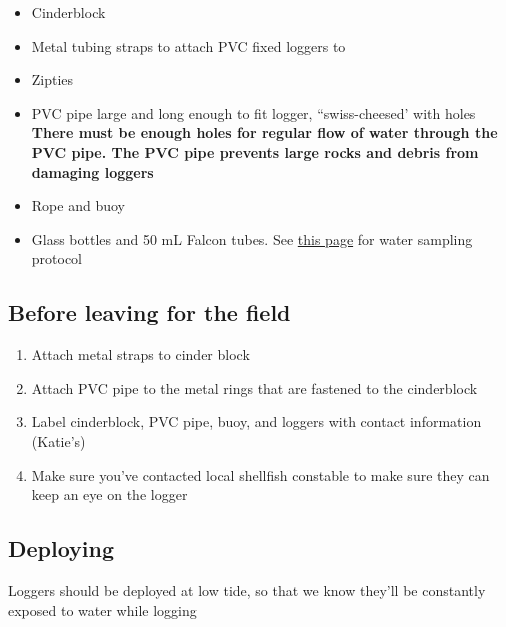 \documentclass[
  letterpaper,
  DIV=11,
  numbers=noendperiod]{scrreprt}
\begin{document}
\begin{itemize}
\item
  Cinderblock
\item
  Metal tubing straps to attach PVC fixed loggers to
\item
  Zipties
\item
  PVC pipe large and long enough to fit logger, ``swiss-cheesed' with
  holes \textbf{There must be enough holes for regular flow of water
  through the PVC pipe. The PVC pipe prevents large rocks and debris
  from damaging loggers}
\item
  Rope and buoy
\item
  Glass bottles and 50 mL Falcon tubes. See
  \href{https://bmford11.github.io/lotterhoslabprotocols/watersampling/}{this
  page} for water sampling protocol
\end{itemize}

\hypertarget{before-leaving-for-the-field-1}{%
\subsection*{\texorpdfstring{\textbf{Before leaving for the
field}}{Before leaving for the field}}\label{before-leaving-for-the-field-1}}

\begin{enumerate}
\def\labelenumi{\arabic{enumi}.}
\item
  Attach metal straps to cinder block
\item
  Attach PVC pipe to the metal rings that are fastened to the
  cinderblock
\item
  Label cinderblock, PVC pipe, buoy, and loggers with contact
  information (Katie's)
\item
  Make sure you've contacted local shellfish constable to make sure they
  can keep an eye on the logger
\end{enumerate}

\hypertarget{deploying-1}{%
\subsection*{\texorpdfstring{\textbf{Deploying}}{Deploying}}\label{deploying-1}}

Loggers should be deployed at low tide, so that we know they'll be
constantly exposed to water while logging
\end{document}
